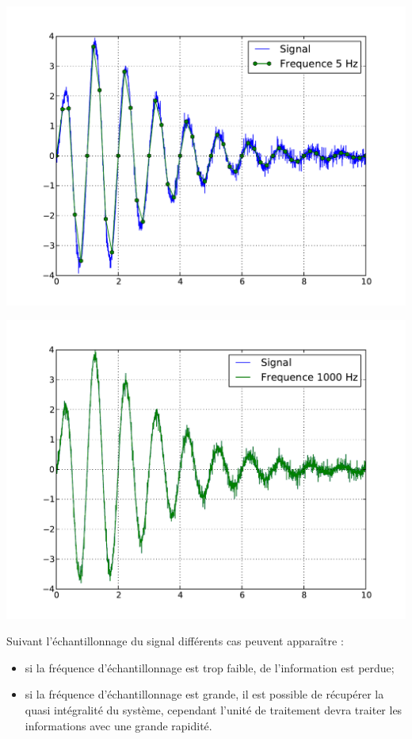 \documentclass[10pt,fleqn]{article} %
\begin{document}
\begin{minipage}[c]{.43\linewidth}
\begin{center}
\includegraphics[width=\textwidth]{images/ech_3}
\end{center}
\end{minipage} \hfill
\begin{minipage}[c]{.43\linewidth}
\begin{center}
\includegraphics[width=\textwidth]{images/ech_4}
\end{center}
\end{minipage} \hfill


Suivant l'échantillonnage du signal différents cas peuvent apparaître : 
\begin{itemize}
\item si la fréquence d'échantillonnage est trop faible, de l'information est perdue;
\item si la fréquence d'échantillonnage est grande, il est possible de récupérer la quasi intégralité du système, cependant l'unité de traitement devra traiter les informations avec une grande rapidité. 
\end{itemize}
\end{document}
